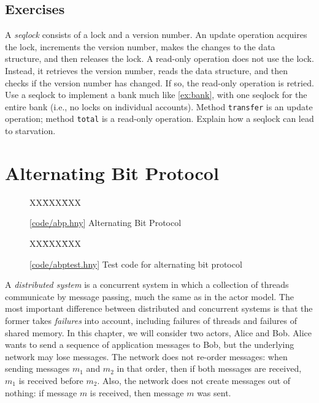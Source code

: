 \documentclass{report}
\newcommand{\harmonysource}[1]{
\begin{tabbing}
XX\=XXX\=XXX\kill
    
\end{tabbing}
}
\newcommand{\harmonylink}[1]{%
[\href{https://harmony.cs.cornell.edu/#1}{\underline{#1}}]%
}
\newenvironment{code}{
\tcolorbox
}{
\endtcolorbox
}
\begin{document}
\section*{Exercises}
\begin{problems}
\item A \emph{seqlock}
%
consists of a lock and a version number.
An update operation acquires the lock, increments the version number, makes the
changes to the data structure, and then releases the lock.  A read-only operation
does not use the lock.  Instead, it retrieves the version number,
reads the data structure, and then checks if the
version number has changed.  If so, the read-only operation is retried.
Use a seqlock to implement a bank much like \autoref{ex:bank}, with
one seqlock for the entire bank (i.e., no locks on individual accounts).
Method \texttt{transfer} is an update operation; method \texttt{total} is a
read-only operation.  Explain how a seqlock can lead to starvation.
\end{problems}

\chapter{Alternating Bit Protocol}
\label{ch:abp}
%
%
%

\begin{figure}
\begin{code}
\harmonysource{abp}
\end{code}
\caption{\harmonylink{code/abp.hny} Alternating Bit Protocol}
\label{fig:abp}
\end{figure}

\begin{figure}
\begin{code}
\harmonysource{abptest}
\end{code}
\caption{\harmonylink{code/abptest.hny} Test code for alternating bit protocol}
\label{fig:abptest}
\end{figure}

A
\emph{distributed system}
%
is a concurrent system in which a collection
of threads communicate by message passing, much the same as
in the actor model.
The most important difference between distributed and concurrent
systems is that the former takes \emph{failures}
%
into account,
including failures of threads and failures of shared memory.
In this chapter, we will consider two actors, Alice and Bob.
Alice wants to send a sequence of application messages to Bob,
but the underlying network may lose messages.
%
The network does not re-order messages: when sending messages
$m_1$ and $m_2$ in that order, then if both messages are received,
$m_1$ is received before $m_2$.
Also, the network does not create messages out of nothing: if
message $m$ is received, then message $m$ was sent.
\end{document}

